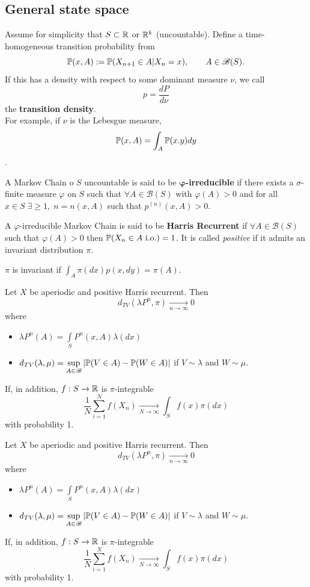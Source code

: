 \documentclass{article}
\begin{document}
\subsection{General state space}
Assume for simplicity that $S\subset\mathbb{R}$ or $\mathbb{R}^k$ (uncountable). Define a time-homogeneous transition probability from 
\[\mathbb{P}(x,A):=\mathbb{P}(X_{n+1}\in A|X_n=x),\qquad A\in\mathscr{B}(S).\]
If this has a density with respect to some dominant measure $\nu$, we call
\[p=\frac{dP}{d\nu}\]
the \textbf{transition density}.\\
For example, if $\nu$ is the Lebesgue measure,
\[\mathbb{P}(x,A)=\int_A \mathbb{P}(x.y)dy\].
\begin{definition}
    A Markov Chain o $S$ uncountable is said to be $\mathbf{\varphi}$\textbf{-irreducible} if there exists a $\sigma$-finite measure $\varphi$ on $S$ such that $\forall A\in\mathscr{B}(S)$ with $\varphi(A)>0$ and for all $x\in S\;\exists\geqslant1,\;n=n(x,A)$ such that $p^{(n)}(x,A)>0$.
\end{definition}
\begin{definition}
    A $\varphi$-irreducible Markov Chain is said to be \textbf{Harris Recurrent} if $\forall A \in \mathscr{B}(S)$ such that $\varphi(A)>0$ then $\mathbb{P}(X_n\in A \text{ i.o.})=1$. It is called \textit{positive} if it admits an invariant distribution $\pi$.
\end{definition}
$\pi$ is invariant if $\int_A\pi(dx)p(x,dy)=\pi(A)$.
\begin{theorem}
    Let $X$ be aperiodic and positive Harris recurrent. Then
        \[d_{TV}(\lambda P^n,\pi)\xrightarrow[n\to\infty]{}0
        \]
        where
        \begin{itemize}
            \item $\displaystyle\lambda P^n(A)=\int\limits_SP^n(x,A)\lambda(dx)$
            \item $\displaystyle d_{TV}(\lambda,\mu)=\sup\limits_{A\in\mathscr{B}}|\mathbb{P}(V\in A)-\mathbb{P}(W\in A)|$ if $V\sim\lambda$ and $W\sim\mu$.
        \end{itemize}
        If, in addition, $f:S\to\mathbb{R}$ is $\pi$-integrable
        \[
        \frac{1}{N}\sum_{i=1}^Nf(X_n)\xrightarrow[N\to\infty]{}\int_Sf(x)\pi(dx)
        \]
        with probability 1.
\end{theorem}
\begin{definition}
    Let $X$ be aperiodic and positive Harris recurrent. Then
        \[d_{TV}(\lambda P^n,\pi)\xrightarrow[n\to\infty]{}0
        \]
        where
        \begin{itemize}
            \item $\displaystyle\lambda P^n(A)=\int\limits_SP^n(x,A)\lambda(dx)$
            \item $\displaystyle d_{TV}(\lambda,\mu)=\sup\limits_{A\in\mathscr{B}}|\mathbb{P}(V\in A)-\mathbb{P}(W\in A)|$ if $V\sim\lambda$ and $W\sim\mu$.
        \end{itemize}
        If, in addition, $f:S\to\mathbb{R}$ is $\pi$-integrable
        \[
        \frac{1}{N}\sum_{i=1}^Nf(X_n)\xrightarrow[N\to\infty]{}\int_Sf(x)\pi(dx)
        \]
        with probability 1.
\end{definition}
\end{document}
